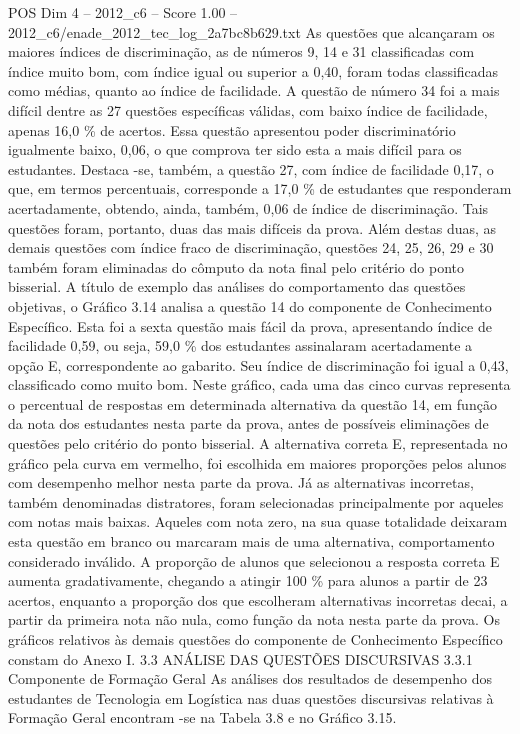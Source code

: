 \begin{textsample}{POS Dim 4 – 2012\_c6 – Score 1.00 – 2012\_c6/enade\_2012\_tec\_log\_2a7bc8b629.txt}
As questões que alcançaram os maiores índices de discriminação, as de números 9, 14 e 31 classificadas com índice muito bom, com índice igual ou superior a 0,40, foram todas classificadas como médias, quanto ao índice de facilidade.
A questão de número 34 foi a mais difícil dentre as 27 questões específicas válidas, com baixo índice de facilidade, apenas 16,0 \% de acertos.
Essa questão apresentou poder discriminatório igualmente baixo, 0,06, o que comprova ter sido esta a mais difícil para os estudantes.
Destaca -se, também, a questão 27, com índice de facilidade 0,17, o que, em termos percentuais, corresponde a 17,0 \% de estudantes que responderam acertadamente, obtendo, ainda, também, 0,06 de índice de discriminação.
Tais questões foram, portanto, duas das mais difíceis da prova.
Além destas duas, as demais questões com índice fraco de discriminação, questões 24, 25, 26, 29 e 30 também foram eliminadas do cômputo da nota final pelo critério do ponto bisserial.
A título de exemplo das análises do comportamento das questões objetivas, o Gráfico 3.14 analisa a questão 14 do componente de Conhecimento Específico.
Esta foi a sexta questão mais fácil da prova, apresentando índice de facilidade 0,59, ou seja, 59,0 \% dos estudantes assinalaram acertadamente a opção E, correspondente ao gabarito.
Seu índice de discriminação foi igual a 0,43, classificado como muito bom.
Neste gráfico, cada uma das cinco curvas representa o percentual de respostas em determinada alternativa da questão 14, em função da nota dos estudantes nesta parte da prova, antes de possíveis eliminações de questões pelo critério do ponto bisserial.
A alternativa correta E, representada no gráfico pela curva em vermelho, foi escolhida em maiores proporções pelos alunos com desempenho melhor nesta parte da prova.
Já as alternativas incorretas, também denominadas distratores, foram selecionadas principalmente por aqueles com notas mais baixas.
Aqueles com nota zero, na sua quase totalidade deixaram esta questão em branco ou marcaram mais de uma alternativa, comportamento considerado inválido.
A proporção de alunos que selecionou a resposta correta E aumenta gradativamente, chegando a atingir 100 \% para alunos a partir de 23 acertos, enquanto a proporção dos que escolheram alternativas incorretas decai, a partir da primeira nota não nula, como função da nota nesta parte da prova.
Os gráficos relativos às demais questões do componente de Conhecimento Específico constam do Anexo I. 3.3 ANÁLISE DAS QUESTÕES DISCURSIVAS 3.3.1 Componente de Formação Geral As análises dos resultados de desempenho dos estudantes de Tecnologia em Logística nas duas questões discursivas relativas à Formação Geral encontram -se na Tabela 3.8 e no Gráfico 3.15.

\end{textsample}

